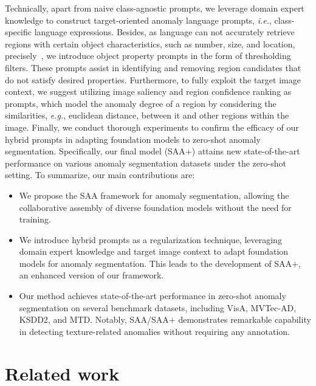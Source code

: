 Technically, apart from naive class-agnostic prompts, we leverage domain expert knowledge to construct target-oriented anomaly language prompts, \textit{i.e.}, class-specific language expressions. Besides, as language can not accurately retrieve regions with certain object characteristics, such as number, size, and location, precisely~\cite{paiss_count_2023,li2022r}, we introduce object property prompts in the form of thresholding filters. These prompts assist in identifying and removing region candidates that do not satisfy desired properties. Furthermore, to fully exploit the target image context, we suggest utilizing image saliency and region confidence ranking as prompts, which model the anomaly degree of a region by considering the similarities, \textit{e.g.}, euclidean distance, between it and other regions within the image. Finally, we conduct thorough experiments to confirm the efficacy of our hybrid prompts in adapting foundation models to zero-shot anomaly segmentation. Specifically, our final model (SAA$+$) attains new state-of-the-art performance on various anomaly segmentation datasets under the zero-shot setting.
To summarize, our main contributions are:
\begin{itemize}
    \item We propose the SAA framework for anomaly segmentation, allowing the collaborative assembly of diverse foundation models without the need for training.
    \item We introduce hybrid prompts as a regularization technique, leveraging domain expert knowledge and target image context to adapt foundation models for anomaly segmentation. This leads to the development of SAA$+$, an enhanced version of our framework.
    \item Our method achieves state-of-the-art performance in zero-shot anomaly segmentation on several benchmark datasets, including VisA, MVTec-AD, KSDD2, and MTD. Notably, SAA/SAA$+$ demonstrates remarkable capability in detecting texture-related anomalies without requiring any annotation.
\end{itemize}

\section{Related work}
\label{sec:related_work}

